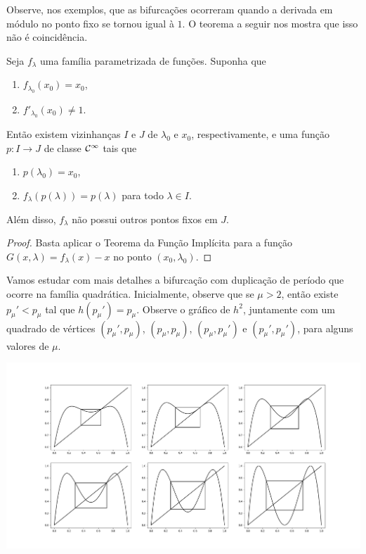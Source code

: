 Observe, nos exemplos, que as bifurcações ocorreram quando a derivada em módulo no ponto fixo se tornou igual à $1$. O teorema a seguir nos mostra que isso não é coincidência.

\begin{theorem}\label{theorem1}
Seja $f_\lambda$ uma família parametrizada de funções.
Suponha que
\begin{enumerate}
\item $f_{\lambda_0}(x_0) = x_0$,
\item $f'_{\lambda_0}(x_0) \neq 1$. 
\end{enumerate}
Então existem vizinhanças $I$ e $J$ de $\lambda_0$ e $x_0$, respectivamente, e uma função $p: I \to J$ de classe $\mathcal{C}^\infty$ tais que
\begin{enumerate}
\item $p(\lambda_0) = x_0$, 
\item $f_\lambda(p(\lambda)) = p(\lambda)$ para todo $\lambda \in I$.
\end{enumerate}
Além disso, $f_\lambda$ não possui outros pontos fixos em $J$.
\end{theorem}

\begin{proof}
Basta aplicar o Teorema da Função Implícita para a função $G(x, \lambda) = f_\lambda(x) - x$ no ponto $(x_0, \lambda_0)$.
\end{proof}

Vamos estudar com mais detalhes a bifurcação com duplicação de período que ocorre na família quadrática.
Inicialmente, observe que se $\mu > 2$, então existe $p_\mu' < p_\mu$ tal que $h(p_\mu') = p_\mu$.
Observe o gráfico de $h^2$, juntamente com um quadrado de vértices $(p_\mu', p_\mu)$, $(p_\mu, p_\mu)$, $(p_\mu, p_\mu')$ e $(p_\mu', p_\mu')$, para alguns valores de $\mu$.
\begin{center}
\includegraphics[scale=0.3]{images/h^2-and-boxes.png}
\end{center}

